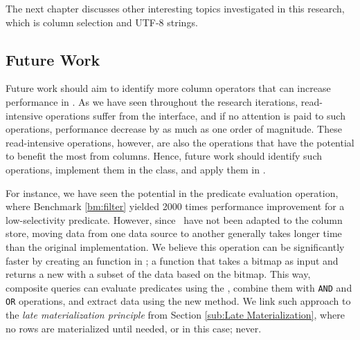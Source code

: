 The next chapter discusses other interesting topics investigated in this research, which is column selection and UTF-8 strings. 

\subsection{Future Work}
\label{operations:future-work}
Future work should aim to identify more column operators that can increase performance in \gap. As we have seen throughout the research iterations, read-intensive operations suffer from the  interface, and if no attention is paid to such operations, performance decrease by as much as one order of magnitude. These read-intensive operations, however, are also the operations that have the potential to benefit the most from columns. Hence, future work should identify such operations, implement them in the  class, and apply them in \gap. 

For instance, we have seen the potential in the predicate evaluation operation, where Benchmark \ref{bm:filter} yielded 2000 times performance improvement for a low-selectivity predicate. However, since \gap~have not been adapted to the column store, moving data from one data source to another generally takes longer time than the original implementation. We believe this operation can be significantly faster by creating an  function in ; a function that takes a bitmap as input and returns a new  with a subset of the data based on the bitmap. This way, composite queries can evaluate predicates using the , combine them with \texttt{AND} and \texttt{OR} operations, and extract data using the new  method. We link such approach to the \textit{late materialization principle} from Section \ref{sub:Late Materialization}, where no rows are materialized until needed, or in this case; never.


